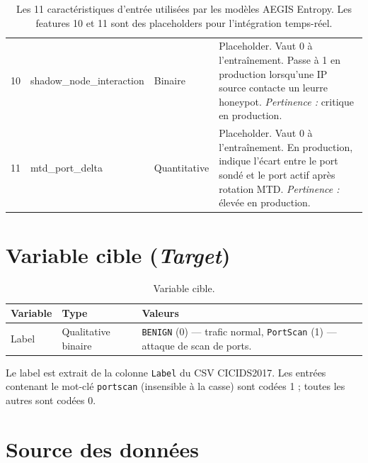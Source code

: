 \documentclass[12pt,a4paper]{article}
\begin{document}
\begin{table}[h!]
\begin{tabularx}{\textwidth}{l l l X}
10 & shadow\_node\_interaction & Binaire & Placeholder. Vaut 0 \`{a} l'entra\^{i}nement.
   Passe \`{a} 1 en production lorsqu'une IP source contacte un leurre honeypot.
   \textit{Pertinence :} critique en production. \\[0.4em]

11 & mtd\_port\_delta & Quantitative & Placeholder. Vaut 0 \`{a} l'entra\^{i}nement.
   En production, indique l'\'{e}cart entre le port sond\'{e} et le port actif
   apr\`{e}s rotation MTD.
   \textit{Pertinence :} \'{e}lev\'{e}e en production. \\[0.4em]

\bottomrule
\end{tabularx}
\caption{Les 11 caract\'{e}ristiques d'entr\'{e}e utilis\'{e}es par les mod\`{e}les
AEGIS Entropy. Les features 10 et 11 sont des placeholders pour l'int\'{e}gration
temps-r\'{e}el.}
\label{tab:features}
\end{table}

\section{Variable cible (\textit{Target})}

\begin{table}[h!]
\centering
\begin{tabularx}{\textwidth}{l l X}
\toprule
\textbf{Variable} & \textbf{Type} & \textbf{Valeurs} \\
\midrule
Label & Qualitative binaire & \texttt{BENIGN} (0) --- trafic normal,
                             \texttt{PortScan} (1) --- attaque de scan de ports. \\
\bottomrule
\end{tabularx}
\caption{Variable cible.}
\end{table}

Le label est extrait de la colonne \texttt{Label} du CSV CICIDS2017. Les entr\'{e}es
contenant le mot-cl\'{e} \texttt{portscan} (insensible \`{a} la casse) sont cod\'{e}es 1 ;
toutes les autres sont cod\'{e}es 0.

\section{Source des donn\'{e}es}
\end{document}
